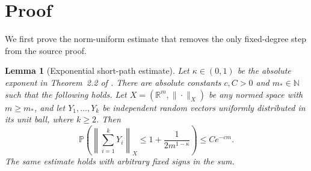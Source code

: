 \documentclass[11pt]{article}
\newtheorem{lemma}[theorem]{Lemma}
\begin{document}
\section*{Proof}

We first prove the norm-uniform estimate that removes the only fixed-degree
step from the source proof.

\begin{lemma}[Exponential short-path estimate]\label{lem:short}
Let $\kappa\in(0,1)$ be the absolute exponent in Theorem~2.2 of \cite{ADTT}.
There are absolute constants $c,C>0$ and $m_\ast\in\mathbb N$ such that the
following holds. Let $X=(\mathbb R^m,\|\cdot\|_X)$ be any normed space with
$m\geq m_\ast$, and let $Y_1,\ldots,Y_k$ be independent random vectors
uniformly distributed in its unit ball, where $k\geq2$. Then
\begin{equation}\label{eq:short}
 \mathbb P\!\left(
  \left\|\sum_{i=1}^kY_i\right\|_X
  \leq1+\frac{1}{2m^{1-\kappa}}
 \right)\leq Ce^{-cm}.
\end{equation}
The same estimate holds with arbitrary fixed signs in the sum.
\end{lemma}
\end{document}
